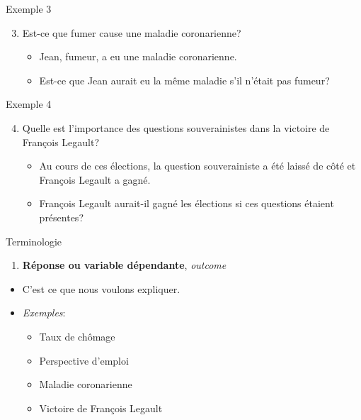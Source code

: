 \documentclass[ignorenonframetext,]{beamer}
\providecommand{\tightlist}{%
  \setlength{\itemsep}{0pt}\setlength{\parskip}{0pt}}
\begin{document}
\begin{frame}{Exemple 3}
\protect\hypertarget{exemple-3}{}

\begin{enumerate}
\setcounter{enumi}{2}
\tightlist
\item
  Est-ce que fumer cause une maladie coronarienne?

  \begin{itemize}
  \tightlist
  \item
    Jean, fumeur, a eu une maladie coronarienne.
  \item
    Est-ce que Jean aurait eu la même maladie s'il n'était pas fumeur?
  \end{itemize}
\end{enumerate}

\end{frame}

\begin{frame}{Exemple 4}
\protect\hypertarget{exemple-4}{}

\begin{enumerate}
\setcounter{enumi}{3}
\tightlist
\item
  Quelle est l'importance des questions souverainistes dans la victoire
  de François Legault?

  \begin{itemize}
  \tightlist
  \item
    Au cours de ces élections, la question souverainiste a été laissé de
    côté et François Legault a gagné.
  \item
    François Legault aurait-il gagné les élections si ces questions
    étaient présentes?
  \end{itemize}
\end{enumerate}

\end{frame}

\begin{frame}{Terminologie}
\protect\hypertarget{terminologie}{}

\begin{enumerate}
\tightlist
\item
  \textbf{Réponse ou variable dépendante}, \emph{outcome}
\end{enumerate}

\begin{itemize}
\tightlist
\item
  C'est ce que nous voulons expliquer.
\item
  \emph{Exemples}:

  \begin{itemize}
  \tightlist
  \item
    Taux de chômage
  \item
    Perspective d'emploi
  \item
    Maladie coronarienne
  \item
    Victoire de François Legault
  \end{itemize}
\end{itemize}

\end{frame}
\end{document}
